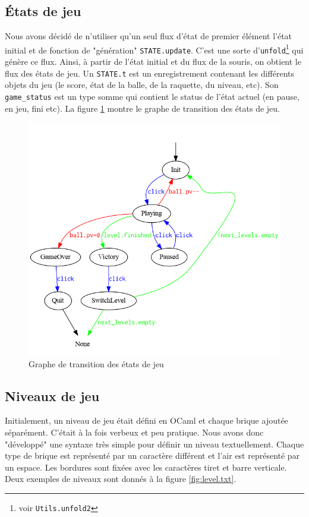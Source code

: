 \documentclass[french]{template}
\begin{document}
\subsection{États de jeu}

Nous avons décidé de n'utiliser qu'un seul flux d'état de premier élément l'état initial et de fonction de "génération" \texttt{STATE.update}. C'est une sorte d'\texttt{unfold}\footnote{voir \texttt{Utils.unfold2}} qui génère ce flux. Ainsi, à partir de l'état initial et du flux de la souris, on obtient le flux des états de jeu. Un \texttt{STATE.t} est un enregistrement contenant les différents objets du jeu (le score, état de la balle, de la raquette, du niveau, etc). Son \texttt{game\_status} est un type somme qui contient le status de l'état actuel (en pause, en jeu, fini etc). La figure \ref{fig:graph} montre le graphe de transition des états de jeu.

\begin{figure}
    \centering
    \includegraphics[width=\textwidth]{img/graph.png}
    \caption{Graphe de transition des états de jeu}
    \label{fig:graph}
\end{figure}

\subsection{Niveaux de jeu}

Initialement, un niveau de jeu était défini en OCaml et chaque brique ajoutée séparément. C'était à la fois verbeux et peu pratique. Nous avons donc "développé" une syntaxe très simple pour définir un niveau textuellement. Chaque type de brique est représenté par un caractère différent et l'air est représenté par un espace. Les bordures sont fixées avec les caractères tiret et barre verticale. Deux exemples de niveaux sont donnés à la figure \ref{fig:level.txt}.
\end{document}
